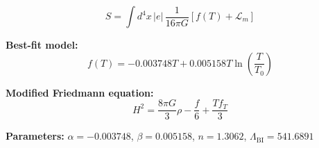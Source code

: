 
\begin{equation}
  S = \int d^4x \, |e| \, \frac{1}{16\pi G} \left[ f(T) + \mathcal{L}_m \right]
\end{equation}

\textbf{Best-fit model:}
\begin{equation}
  f(T) = -0.003748 T + 0.005158 T \ln\!\left(\frac{T}{T_0}\right)
\end{equation}

\textbf{Modified Friedmann equation:}
\begin{equation}
  H^2 = \frac{8\pi G}{3} \rho - \frac{f}{6} + \frac{T f_T}{3}
\end{equation}

\textbf{Parameters:}
$\alpha = -0.003748$, \quad
$\beta = 0.005158$, \quad
$n = 1.3062$, \quad
$\Lambda_{\text{BI}} = 541.6891$